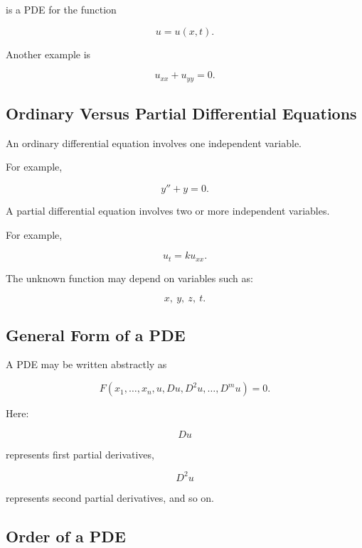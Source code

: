 is a PDE for the function

\[
u=u(x,t).
\]

Another example is

\[
\boxed{
u_{xx}+u_{yy}=0.
}
\]

\subsection{Ordinary Versus Partial Differential Equations}
\label{subsec:ode-versus-pde-extended}

An ordinary differential equation involves one independent variable.

For example,

\[
\boxed{
y''+y=0.
}
\]

A partial differential equation involves two or more independent
variables.

For example,

\[
\boxed{
u_t
=
ku_{xx}.
}
\]

The unknown function may depend on variables such as:

\[
\boxed{
x,\ y,\ z,\ t.
}
\]

\subsection{General Form of a PDE}
\label{subsec:general-form-pde}

A PDE may be written abstractly as

\[
\boxed{
F
\left(
x_1,\ldots,x_n,
u,
Du,
D^2u,
\ldots,
D^mu
\right)
=
0.
}
\]

Here:

\[
Du
\]

represents first partial derivatives,

\[
D^2u
\]

represents second partial derivatives, and so on.

\subsection{Order of a PDE}
\label{subsec:pde-order}

